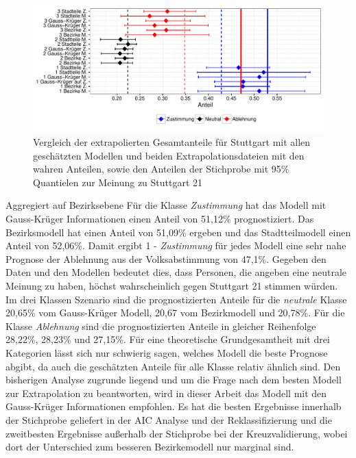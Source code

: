 \documentclass{Vorlage}
\begin{document}
\begin{figure}[h]
 \begin{center}
 \includegraphics[scale=0.8]{Pictures/S21AlleModelle}
 \caption{Vergleich der extrapolierten Gesamtanteile für Stuttgart mit allen geschätzten Modellen und beiden Extrapolationsdateien mit den wahren Anteilen, sowie den Anteilen der Stichprobe mit 95\% Quantielen zur Meinung zu Stuttgart 21}
 \label{S21Alle}
 \end{center}
\end{figure}

Aggregiert auf Bezirksebene Für die Klasse \textit{Zustimmung} hat das Modell mit Gauss-Krüger Informationen einen Anteil von 51,12\% prognostiziert. Das Bezirksmodell hat einen Anteil von 51,09\% ergeben und das Stadtteilmodell einen Anteil von 52,06\%. Damit ergibt 1 - \textit{Zustimmung} für jedes Modell eine sehr nahe Prognose der Ablehnung aus der Volksabstimmung von 47,1\%. Gegeben den Daten und den Modellen bedeutet dies, dass Personen, die angeben eine neutrale Meinung zu haben, höchst wahrscheinlich gegen Stuttgart 21 stimmen würden. Im drei Klassen Szenario sind die prognostizierten Anteile für die \textit{neutrale} Klasse 20,65\% vom Gauss-Krüger Modell, 20,67 vom Bezirkmodell und 20,78\%. Für die Klasse \textit{Ablehnung} sind die prognostizierten Anteile in gleicher Reihenfolge 28,22\%, 28,23\% und 27,15\%. Für eine theoretische Grundgesamtheit mit drei Kategorien lässt sich nur schwierig sagen, welches Modell die beste Prognose abgibt, da auch die geschätzten Anteile für alle Klasse relativ ähnlich sind. Den bisherigen Analyse zugrunde liegend und um die Frage nach dem besten Modell zur Extrapolation zu beantworten, wird in dieser Arbeit das Modell mit den Gauss-Krüger Informationen empfohlen. Es hat die besten Ergebnisse innerhalb der Stichprobe geliefert in der AIC Analyse  und der Reklassifizierung und die zweitbesten Ergebnisse außerhalb der Stichprobe bei der Kreuzvalidierung, wobei dort der Unterschied zum besseren Bezirkemodell nur marginal sind.
\end{document}

